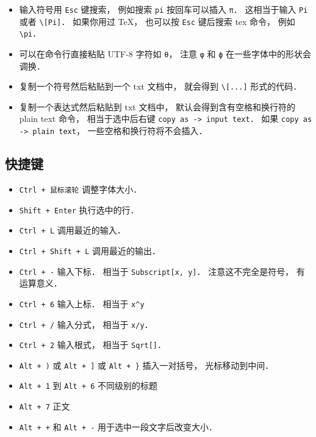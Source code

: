 \begin{itemize}
\item 输入符号用 \verb|Esc| 键搜索， 例如搜索 \verb|pi| 按回车可以插入 \verb|π|． 这相当于输入 \verb|Pi| 或者 \verb|\[Pi]|． 如果你用过 TeX， 也可以按 \verb|Esc| 键后搜索 tex 命令， 例如 \verb|\pi|．
\item 可以在命令行直接粘贴 UTF-8 字符如 \verb|θ|， 注意 \verb|φ| 和 \verb|ϕ| 在一些字体中的形状会调换．
\item 复制一个符号然后粘贴到一个 txt 文档中， 就会得到 \verb|\[...]| 形式的代码．
\item 复制一个表达式然后粘贴到 txt 文档中， 默认会得到含有空格和换行符的 plain text 命令， 相当于选中后右键 \verb|copy as -> input text|． 如果 \verb|copy as -> plain text|， 一些空格和换行符将不会插入．
\end{itemize}

\subsection{快捷键}
\begin{itemize}
\item \verb|Ctrl + 鼠标滚轮| 调整字体大小．
\item \verb|Shift + Enter| 执行选中的行．
\item \verb|Ctrl + L| 调用最近的输入．
\item \verb|Ctrl + Shift + L| 调用最近的输出．
\item \verb|Ctrl + -| 输入下标． 相当于 \verb|Subscript[x, y]|． 注意这不完全是符号， 有运算意义．
\item \verb|Ctrl + 6| 输入上标． 相当于 \verb|x^y|
\item \verb|Ctrl + /| 输入分式， 相当于 \verb|x/y|．
\item \verb|Ctrl + 2| 输入根式， 相当于 \verb|Sqrt[]|．
\item \verb|Alt + )| 或 \verb|Alt + ]| 或 \verb|Alt + }| 插入一对括号， 光标移动到中间．
\item \verb|Alt + 1| 到 \verb|Alt + 6| 不同级别的标题
\item \verb|Alt + 7| 正文
\item \verb|Alt + +| 和 \verb|Alt + -| 用于选中一段文字后改变大小．
\end{itemize}

